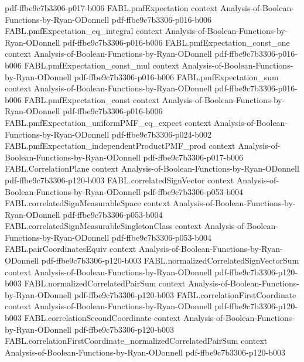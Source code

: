 \begin{theorem}
  {pdf-ffbe9c7b3306-p017-b006}
\proofstep
  {FABL.pmfExpectation}
  {context}
  {Analysis-of-Boolean-Functions-by-Ryan-ODonnell}
  {pdf-ffbe9c7b3306-p016-b006}
\proofstep
  {FABL.pmfExpectation_eq_integral}
  {context}
  {Analysis-of-Boolean-Functions-by-Ryan-ODonnell}
  {pdf-ffbe9c7b3306-p016-b006}
\proofstep
  {FABL.pmfExpectation_const_one}
  {context}
  {Analysis-of-Boolean-Functions-by-Ryan-ODonnell}
  {pdf-ffbe9c7b3306-p016-b006}
\proofstep
  {FABL.pmfExpectation_const_mul}
  {context}
  {Analysis-of-Boolean-Functions-by-Ryan-ODonnell}
  {pdf-ffbe9c7b3306-p016-b006}
\proofstep
  {FABL.pmfExpectation_sum}
  {context}
  {Analysis-of-Boolean-Functions-by-Ryan-ODonnell}
  {pdf-ffbe9c7b3306-p016-b006}
\proofstep
  {FABL.pmfExpectation_const}
  {context}
  {Analysis-of-Boolean-Functions-by-Ryan-ODonnell}
  {pdf-ffbe9c7b3306-p016-b006}
\proofstep
  {FABL.pmfExpectation_uniformPMF_eq_expect}
  {context}
  {Analysis-of-Boolean-Functions-by-Ryan-ODonnell}
  {pdf-ffbe9c7b3306-p024-b002}
\proofstep
  {FABL.pmfExpectation_independentProductPMF_prod}
  {context}
  {Analysis-of-Boolean-Functions-by-Ryan-ODonnell}
  {pdf-ffbe9c7b3306-p017-b006}
\proofstep
  {FABL.CorrelationPlane}
  {context}
  {Analysis-of-Boolean-Functions-by-Ryan-ODonnell}
  {pdf-ffbe9c7b3306-p120-b003}
\proofstep
  {FABL.correlatedSignVector}
  {context}
  {Analysis-of-Boolean-Functions-by-Ryan-ODonnell}
  {pdf-ffbe9c7b3306-p053-b004}
\proofstep
  {FABL.correlatedSignMeasurableSpace}
  {context}
  {Analysis-of-Boolean-Functions-by-Ryan-ODonnell}
  {pdf-ffbe9c7b3306-p053-b004}
\proofstep
  {FABL.correlatedSignMeasurableSingletonClass}
  {context}
  {Analysis-of-Boolean-Functions-by-Ryan-ODonnell}
  {pdf-ffbe9c7b3306-p053-b004}
\proofstep
  {FABL.pairCoordinatesEquiv}
  {context}
  {Analysis-of-Boolean-Functions-by-Ryan-ODonnell}
  {pdf-ffbe9c7b3306-p120-b003}
\proofstep
  {FABL.normalizedCorrelatedSignVectorSum}
  {context}
  {Analysis-of-Boolean-Functions-by-Ryan-ODonnell}
  {pdf-ffbe9c7b3306-p120-b003}
\proofstep
  {FABL.normalizedCorrelatedPairSum}
  {context}
  {Analysis-of-Boolean-Functions-by-Ryan-ODonnell}
  {pdf-ffbe9c7b3306-p120-b003}
\proofstep
  {FABL.correlationFirstCoordinate}
  {context}
  {Analysis-of-Boolean-Functions-by-Ryan-ODonnell}
  {pdf-ffbe9c7b3306-p120-b003}
\proofstep
  {FABL.correlationSecondCoordinate}
  {context}
  {Analysis-of-Boolean-Functions-by-Ryan-ODonnell}
  {pdf-ffbe9c7b3306-p120-b003}
\proofstep
  {FABL.correlationFirstCoordinate_normalizedCorrelatedPairSum}
  {context}
  {Analysis-of-Boolean-Functions-by-Ryan-ODonnell}
  {pdf-ffbe9c7b3306-p120-b003}
\proofstep

\end{theorem}
